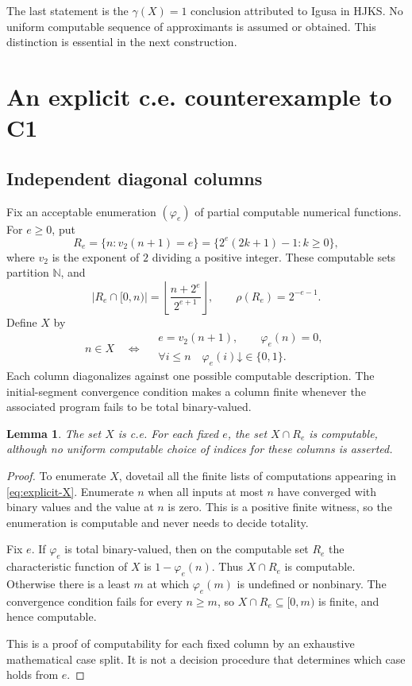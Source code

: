 \documentclass[11pt,a4paper]{article}
\newcommand{\N}{\mathbb N}
\newcommand{\down}{\mathord{\downarrow}}
\newtheorem{lemma}[theorem]{Lemma}
\theoremstyle{definition}\newtheorem{definition}[theorem]{Definition}
\theoremstyle{remark}\newtheorem{remark}[theorem]{Remark}
\begin{document}
The last statement is the $\gamma(X)=1$ conclusion attributed to Igusa in HJKS.\cite[Theorem 4.3]{HJKS} No uniform computable sequence of approximants is assumed or obtained. This distinction is essential in the next construction.

\section{An explicit c.e. counterexample to C1}
\label{sec:counterexample}
\subsection{Independent diagonal columns}
Fix an acceptable enumeration $(\varphi_e)$ of partial computable numerical functions. For $e\ge0$, put
\begin{equation}\label{eq:columns}
 R_e=\{n:v_2(n+1)=e\}
     =\{2^e(2k+1)-1:k\ge0\},
\end{equation}
where $v_2$ is the exponent of $2$ dividing a positive integer. These computable sets partition $\N$, and
\begin{equation}\label{eq:column-count}
 |R_e\cap[0,n)|=\left\lfloor\frac{n+2^e}{2^{e+1}}\right\rfloor,
 \qquad \rho(R_e)=2^{-e-1}.
\end{equation}
Define $X$ by
\begin{equation}\label{eq:explicit-X}
\boxed{\quad
 n\in X\quad\Longleftrightarrow\quad
 \begin{gathered}
 e=v_2(n+1),\qquad \varphi_e(n)=0,\\[-2pt]
 \forall i\le n\quad\varphi_e(i)\down\in\{0,1\}.
 \end{gathered}\quad}
\end{equation}
Each column diagonalizes against one possible computable description. The initial-segment convergence condition makes a column finite whenever the associated program fails to be total binary-valued.

\begin{lemma}\label{lem:columns}
The set $X$ is c.e. For each fixed $e$, the set $X\cap R_e$ is computable, although no uniform computable choice of indices for these columns is asserted.
\end{lemma}
\begin{proof}
To enumerate $X$, dovetail all the finite lists of computations appearing in \eqref{eq:explicit-X}. Enumerate $n$ when all inputs at most $n$ have converged with binary values and the value at $n$ is zero. This is a positive finite witness, so the enumeration is computable and never needs to decide totality.

Fix $e$. If $\varphi_e$ is total binary-valued, then on the computable set $R_e$ the characteristic function of $X$ is $1-\varphi_e(n)$. Thus $X\cap R_e$ is computable. Otherwise there is a least $m$ at which $\varphi_e(m)$ is undefined or nonbinary. The convergence condition fails for every $n\ge m$, so $X\cap R_e\subseteq[0,m)$ is finite, and hence computable.

This is a proof of computability for each fixed column by an exhaustive mathematical case split. It is not a decision procedure that determines which case holds from $e$.
\end{proof}
\end{document}
